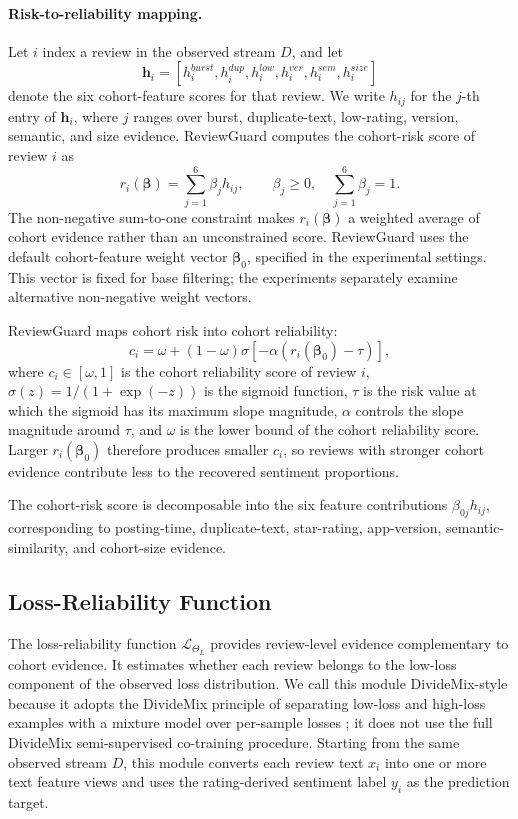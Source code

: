 \documentclass[runningheads]{llncs}
\begin{document}
\paragraph{Risk-to-reliability mapping.}
Let \(i\) index a review in the observed stream \(D\), and let
\[
\mathbf{h}_i=[h_i^{burst},h_i^{dup},h_i^{low},h_i^{ver},h_i^{sem},h_i^{size}]
\]
denote the six cohort-feature scores for that review. We write \(h_{ij}\) for the \(j\)-th entry of \(\mathbf{h}_i\), where \(j\) ranges over burst, duplicate-text, low-rating, version, semantic, and size evidence. ReviewGuard computes the cohort-risk score of review \(i\) as
\[
r_i(\boldsymbol{\beta})=\sum_{j=1}^{6}\beta_j h_{ij},
\qquad
\beta_j\ge 0,\quad \sum_{j=1}^{6}\beta_j=1 .
\]
The non-negative sum-to-one constraint makes \(r_i(\boldsymbol{\beta})\) a weighted average of cohort evidence rather than an unconstrained score. ReviewGuard uses the default cohort-feature weight vector \(\boldsymbol{\beta}_0\), specified in the experimental settings. This vector is fixed for base filtering; the experiments separately examine alternative non-negative weight vectors.

ReviewGuard maps cohort risk into cohort reliability:
\[
c_i = \omega + (1-\omega)\sigma[-\alpha(r_i(\boldsymbol{\beta}_0)-\tau)],
\]
where \(c_i\in[\omega,1]\) is the cohort reliability score of review \(i\), \(\sigma(z)=1/(1+\exp(-z))\) is the sigmoid function, \(\tau\) is the risk value at which the sigmoid has its maximum slope magnitude, \(\alpha\) controls the slope magnitude around \(\tau\), and \(\omega\) is the lower bound of the cohort reliability score. Larger \(r_i(\boldsymbol{\beta}_0)\) therefore produces smaller \(c_i\), so reviews with stronger cohort evidence contribute less to the recovered sentiment proportions.

The cohort-risk score is decomposable into the six feature contributions \(\beta_{0j}h_{ij}\), corresponding to posting-time, duplicate-text, star-rating, app-version, semantic-similarity, and cohort-size evidence.

\subsection{Loss-Reliability Function}

The loss-reliability function \(\mathcal{L}_{\Theta_L}\) provides review-level evidence complementary to cohort evidence. It estimates whether each review belongs to the low-loss component of the observed loss distribution. We call this module DivideMix-style because it adopts the DivideMix principle of separating low-loss and high-loss examples with a mixture model over per-sample losses \cite{li2020dividemix}; it does not use the full DivideMix semi-supervised co-training procedure. Starting from the same observed stream \(D\), this module converts each review text \(x_i\) into one or more text feature views and uses the rating-derived sentiment label \(y_i\) as the prediction target.
\end{document}
